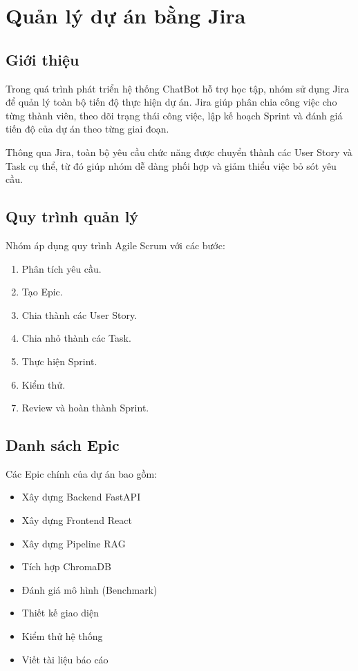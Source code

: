\chapter{Quản lý dự án bằng Jira}

\section{Giới thiệu}

Trong quá trình phát triển hệ thống ChatBot hỗ trợ học tập, nhóm sử dụng Jira để quản lý toàn bộ tiến độ thực hiện dự án. Jira giúp phân chia công việc cho từng thành viên, theo dõi trạng thái công việc, lập kế hoạch Sprint và đánh giá tiến độ của dự án theo từng giai đoạn.

Thông qua Jira, toàn bộ yêu cầu chức năng được chuyển thành các User Story và Task cụ thể, từ đó giúp nhóm dễ dàng phối hợp và giảm thiểu việc bỏ sót yêu cầu.

\section{Quy trình quản lý}

Nhóm áp dụng quy trình Agile Scrum với các bước:

\begin{enumerate}
	\item Phân tích yêu cầu.
	\item Tạo Epic.
	\item Chia thành các User Story.
	\item Chia nhỏ thành các Task.
	\item Thực hiện Sprint.
	\item Kiểm thử.
	\item Review và hoàn thành Sprint.
\end{enumerate}

\section{Danh sách Epic}

Các Epic chính của dự án bao gồm:

\begin{itemize}
	\item Xây dựng Backend FastAPI
	\item Xây dựng Frontend React
	\item Xây dựng Pipeline RAG
	\item Tích hợp ChromaDB
	\item Đánh giá mô hình (Benchmark)
	\item Thiết kế giao diện
	\item Kiểm thử hệ thống
	\item Viết tài liệu báo cáo
\end{itemize}

